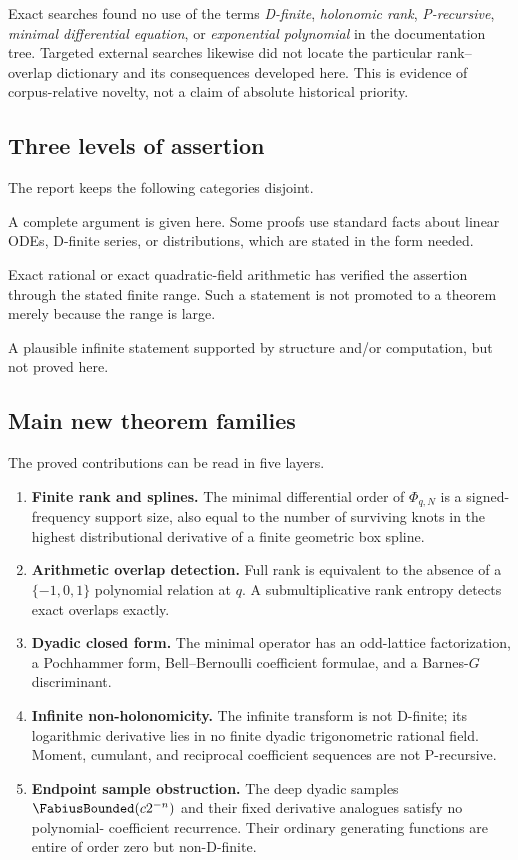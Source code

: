 \documentclass[11pt]{article}
\numberwithin{equation}{section}
\theoremstyle{definition}
\theoremstyle{remark}
\newcommand{\provedtag}{\textsc{proved}}
\newcommand{\computedtag}{\textsc{exact computation}}
\newcommand{\conjtag}{\textsc{conjectural}}
\begin{document}
Exact searches found no use of the terms \emph{D-finite}, \emph{holonomic
rank}, \emph{P-recursive}, \emph{minimal differential equation}, or
\emph{exponential polynomial} in the documentation tree.  Targeted external
searches likewise did not locate the particular rank--overlap dictionary and
its consequences developed here.  This is evidence of corpus-relative
novelty, not a claim of absolute historical priority.

\subsection{Three levels of assertion}

The report keeps the following categories disjoint.
\begin{description}[style=nextline,leftmargin=2.8cm]
  \item[\provedtag] A complete argument is given here.  Some proofs use standard
  facts about linear ODEs, D-finite series, or distributions, which are stated
  in the form needed.
  \item[\computedtag] Exact rational or exact quadratic-field arithmetic has
  verified the assertion through the stated finite range.  Such a statement is
  not promoted to a theorem merely because the range is large.
  \item[\conjtag] A plausible infinite statement supported by structure and/or
  computation, but not proved here.
\end{description}

\subsection{Main new theorem families}

The proved contributions can be read in five layers.
\begin{enumerate}
  \item \textbf{Finite rank and splines.}  The minimal differential order of
  $\Phi_{q,N}$ is a signed-frequency support size, also equal to the number of
  surviving knots in the highest distributional derivative of a finite
  geometric box spline.
  \item \textbf{Arithmetic overlap detection.}  Full rank is equivalent to the
  absence of a $\{-1,0,1\}$ polynomial relation at $q$.  A submultiplicative
  rank entropy detects exact overlaps exactly.
  \item \textbf{Dyadic closed form.}  The minimal operator has an odd-lattice
  factorization, a Pochhammer form, Bell--Bernoulli coefficient formulae, and a
  Barnes-$G$ discriminant.
  \item \textbf{Infinite non-holonomicity.}  The infinite transform is not
  D-finite; its logarithmic derivative lies in no finite dyadic trigonometric
  rational field.  Moment, cumulant, and reciprocal coefficient sequences are
  not P-recursive.
  \item \textbf{Endpoint sample obstruction.}  The deep dyadic samples
  $\FabiusBounded(c2^{-n})$ and their fixed derivative analogues satisfy no polynomial-
  coefficient recurrence.  Their ordinary generating functions are entire of
  order zero but non-D-finite.
\end{enumerate}
\end{document}
